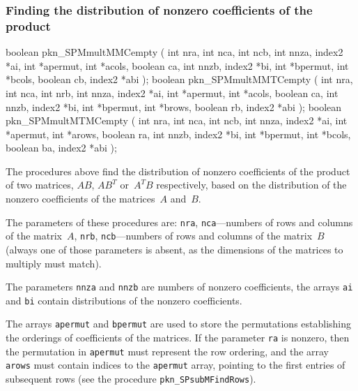 \subsubsection{Finding the distribution of nonzero coefficients of the product}

\begin{listingC}
boolean pkn_SPMmultMMCempty ( int nra, int nca, int ncb,
                              int nnza, index2 *ai,
                              int *apermut, int *acols, boolean ca,
                              int nnzb, index2 *bi,
                              int *bpermut, int *bcols, boolean cb,
                              index2 *abi );
boolean pkn_SPMmultMMTCempty ( int nra, int nca, int nrb,
                               int nnza, index2 *ai,
                               int *apermut, int *acols, boolean ca,
                               int nnzb, index2 *bi,
                               int *bpermut, int *brows, boolean rb,
                               index2 *abi );
boolean pkn_SPMmultMTMCempty ( int nra, int nca, int ncb,
                               int nnza, index2 *ai,
                               int *apermut, int *arows, boolean ra,
                               int nnzb, index2 *bi,
                               int *bpermut, int *bcols, boolean ba,
                               index2 *abi );
\end{listingC}
The procedures above find the distribution of nonzero coefficients of the
product of two matrices, $AB$, $AB^T$ or~$A^TB$ respectively, based on the
distribution of the nonzero coefficients of the matrices~$A$ and~$B$.

The parameters of these procedures are: \texttt{nra}, \texttt{nca}---numbers
of rows and columns of the matrix~$A$, \texttt{nrb}, \texttt{ncb}---numbers
of rows and columns of the matrix~$B$ (always one of those parameters is
absent, as the dimensions of the matrices to multiply must match).

The parameters \texttt{nnza} and \texttt{nnzb} are numbers of nonzero
coefficients, the arrays \texttt{ai} and \texttt{bi} contain distributions of
the nonzero coefficients.

The arrays \texttt{apermut} and \texttt{bpermut} are used to store the
permutations establishing the orderings of coefficients of the matrices.
If the parameter \texttt{ra} is nonzero, then the permutation in
\texttt{apermut} must represent the row ordering, and the array
\texttt{arows} must contain indices to the \texttt{apermut} array, pointing
to the first entries of subsequent rows (see the procedure
\texttt{pkn\_SPsubMFindRows}).

